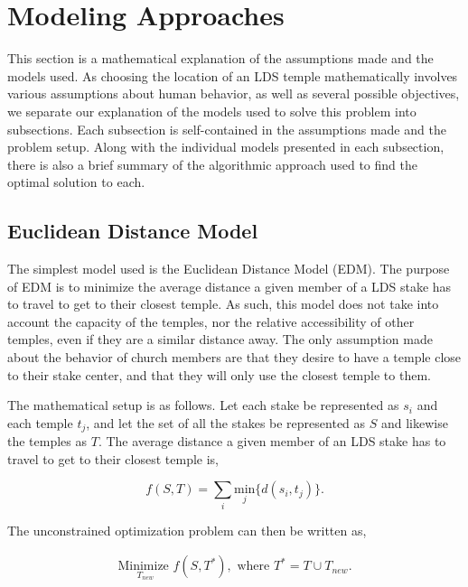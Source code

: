 \documentclass[twoside,twocolumn]{article}
\begin{document}
\section{Modeling Approaches}
\label{sec:models}
This section is a mathematical explanation of the assumptions made and the models used. As choosing the location of an LDS temple mathematically involves various assumptions about human behavior, as well as several possible objectives, we separate our explanation of the models used to solve this problem into subsections. Each subsection is self-contained in the assumptions made and the problem setup. Along with the individual models presented in each subsection, there is also a brief summary of the algorithmic approach used to find the optimal solution to each.

\subsection{Euclidean Distance Model} %

The simplest model used is the Euclidean Distance Model (EDM). The purpose of EDM is to minimize the average distance a given member of a LDS stake has to travel to get to their closest temple. As such, this model does not take into account the capacity of the temples, nor the relative accessibility of other temples, even if they are a similar distance away. The only assumption made about the behavior of church members are that they desire to have a temple close to their stake center, and that they will only use the closest temple to them.

The mathematical setup is as follows. Let each stake be represented as $s_i$ and each temple $t_j$, and let the set of all the stakes be represented as $S$ and likewise the temples as $T$. The average distance a given member of an LDS stake has to travel to get to their closest temple is, 

\begin{equation}
	f(S,T) = \sum_i \underset{j}{\text{min}}\{d(s_i,t_j)\}.
\end{equation}

The unconstrained optimization problem can then be written as,

\begin{equation}
\begin{aligned}
	\underset{T_{new}}{\text{Minimize }} f(S,T^*), \text{ where } T^* = T \cup T_{new}.
\end{aligned}
\end{equation}
\end{document}

